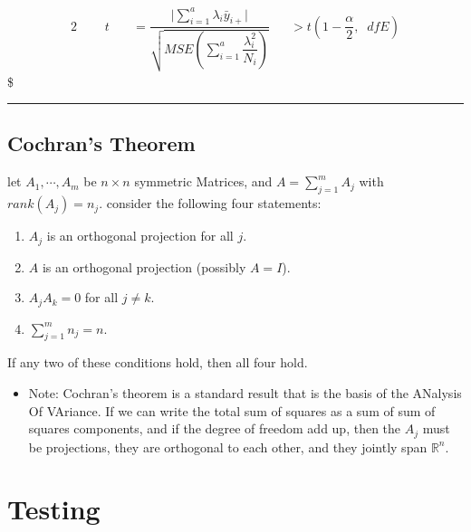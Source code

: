 \documentclass[
]{book}
\providecommand{\tightlist}{%
  \setlength{\itemsep}{0pt}\setlength{\parskip}{0pt}}
\begin{document}
{{{\begin{alignat}{2}
\; \; \; \; \; 

& t  \

&&= 


\dfrac
{\Bigg \vert \sum_{i=1}^a \lambda_i \bar y_{i+} \Bigg \vert}
{\sqrt{MSE \left( \sum_{i=1}^a\dfrac{\lambda_i^2}{N_i}\right)  }}


&&> 


t \left( 1-\dfrac{\alpha}{2}, \; \; dfE \right)

\end{alignat}
\$

\begin{center}\rule{0.5\linewidth}{0.5pt}\end{center}

\hypertarget{cochrans-theorem}{%
\subsection{Cochran's Theorem}\label{cochrans-theorem}}

let \(A_1 , \cdots, A_m\) be \(n \times n\) symmetric Matrices, and \(A = \sum_{j=1}^m A_j\) with \(rank(A_j) = n_j\). consider the following four statements:

\begin{enumerate}
\def\labelenumi{\arabic{enumi}.}
\tightlist
\item
  \(A_j\) is an orthogonal projection for all \(j\).
\item
  \(A\) is an orthogonal projection (possibly \(A=I\)).
\item
  \(A_j A_k = 0\) for all \(j \not = k\).
\item
  \(\sum_{j=1}^m n_j = n\).
\end{enumerate}

If any two of these conditions hold, then all four hold.

\begin{itemize}
\tightlist
\item
  Note: Cochran's theorem is a standard result that is the basis of the ANalysis Of VAriance. If we can write the total sum of squares as a sum of sum of squares components, and if the degree of freedom add up, then the \(A_j\) must be projections, they are orthogonal to each other, and they jointly span \(\mathbb{R}^n\).
\end{itemize}

\hypertarget{testing}{%
\section{Testing}\label{testing}}

}}}
\end{document}
